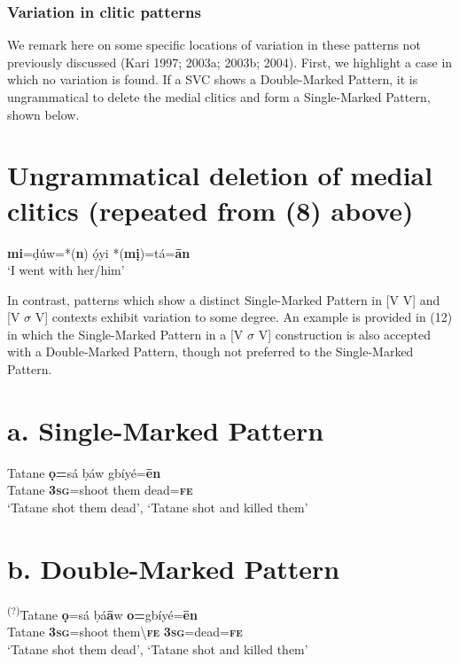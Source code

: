 \documentclass[output=paper]{langsci/langscibook}
\begin{document}
\subsection{\rmfamily Variation in clitic patterns}
\label{bkm:Ref449531511}
We remark here on some specific locations of variation in these patterns not previously discussed (Kari 1997; 2003a; 2003b; 2004). First, we highlight a case in which no variation is found. If a SVC shows a Double-Marked Pattern, it is ungrammatical to delete the medial clitics and form a Single-Marked Pattern, shown below.

\chapter[Ungrammatical deletion of medial clitics (repeated from (8) above)]{Ungrammatical deletion of medial clitics (repeated from (8) above)}
\gll \textbf{mi}=ḍúw=*(\textbf{n})   ọ́yi   *(\textbf{mị})=tá=\textbf{\={a}n}\\
\glt ‘I went with her/him’ \citep[201]{Kari2004}
\z

In contrast, patterns which show a distinct Single-Marked Pattern in [V V] and [V $\sigma $ V] contexts exhibit variation to some degree. An example is provided in (12) in which the Single-Marked Pattern in a [V $\sigma $ V] construction is also accepted with a Double-Marked Pattern, though not preferred to the Single-Marked Pattern.

\chapter[a. Single{}-Marked Pattern ]{a. Single-Marked Pattern }
\label{bkm:Ref448138971}\label{bkm:Ref448215142}\gll   Tatane  \textbf{ọ=}sá    ḅáw   gbíyé=\textbf{\={e}n}\\
     Tatane  \textbf{3}\textbf{\textsc{sg}}=shoot  them   dead=\textbf{\textsc{fe}}\\
\glt ‘Tatane shot them dead’, ‘Tatane shot and killed them’ 
\z

\chapter{b. Double-Marked Pattern}
\gll \textsuperscript{(?)}Tatane  \textbf{ọ}=sá    ḅá\textbf{\={a}}w    \textbf{o=}gbíyé=\textbf{\={e}n}\\
     Tatane  \textbf{3}\textbf{\textsc{sg}}=shoot   them{\textbackslash}\textbf{\textsc{fe    }}\textbf{3}\textbf{\textsc{sg}}=dead=\textbf{\textsc{fe}}\\
\glt ‘Tatane shot them dead’, ‘Tatane shot and killed them’
\z
\end{document}

